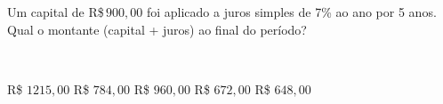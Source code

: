 \parbox{\linewidth}{

Um capital de R\$\,$900{,}00$ foi aplicado a juros simples de 7\% ao ano por 5 anos. Qual o montante (capital + juros) ao final do período?}
\vspace{2mm}
\\\parbox{\linewidth}{

R\$ $1215{,}00$
R\$ $784{,}00$
R\$ $960{,}00$
R\$ $672{,}00$
R\$ $648{,}00$

}


